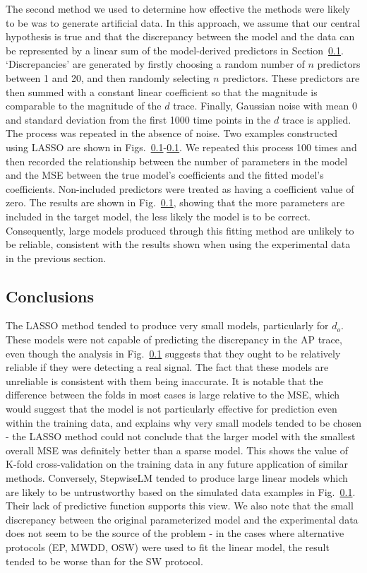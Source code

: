 \documentclass[11pt,a4paper,oneside]{article}
\begin{document}
The second method we used to determine how effective the methods were likely to be was to generate artificial data. In this approach, we assume that our central hypothesis is true and that the discrepancy between the model and the data can be represented by a linear sum of the model-derived predictors in Section~\ref{}. `Discrepancies' are generated by firstly choosing a random number of $n$ predictors between 1 and 20, and then randomly selecting $n$ predictors. These predictors are then summed with a constant linear coefficient so that the magnitude is comparable to the magnitude of the $d$ trace. Finally, Gaussian noise with mean 0 and standard deviation from the first 1000 time points in the $d$ trace is applied. The process was repeated in the absence of noise. Two examples constructed using LASSO are shown in Figs.~\ref{}-\ref{}. We repeated this process 100 times and then recorded the relationship between the number of parameters in the model and the MSE between the true model's coefficients and the fitted model's coefficients. Non-included predictors were treated as having a coefficient value of zero. The results are shown in Fig.~\ref{}, showing that the more parameters are included in the target model, the less likely the model is to be correct. Consequently, large models produced through this fitting method are unlikely to be reliable, consistent with the results shown when using the experimental data in the previous section.

\subsection{Conclusions}

The LASSO method tended to produce very small models, particularly for $d_o$. These models were not capable of predicting the discrepancy in the AP trace, even though the analysis in Fig.~\ref{} suggests that they ought to be relatively reliable if they were detecting a real signal. The fact that these models are unreliable is consistent with them being inaccurate. It is notable that the difference between the folds in most cases is large relative to the MSE, which would suggest that the model is not particularly effective for prediction even within the training data, and explains why very small models tended to be chosen - the LASSO method could not conclude that the larger model with the smallest overall MSE was definitely better than a sparse model. This shows the value of K-fold cross-validation on the training data in any future application of similar methods. Conversely, StepwiseLM tended to produce large linear models which are likely to be untrustworthy based on the simulated data examples in Fig.~\ref{}. Their lack of predictive function supports this view. We also note that the small discrepancy between the original parameterized model and the experimental data does not seem to be the source of the problem - in the cases where alternative protocols (EP, MWDD, OSW) were used to fit the linear model, the result tended to be worse than for the SW protocol.
\end{document}

